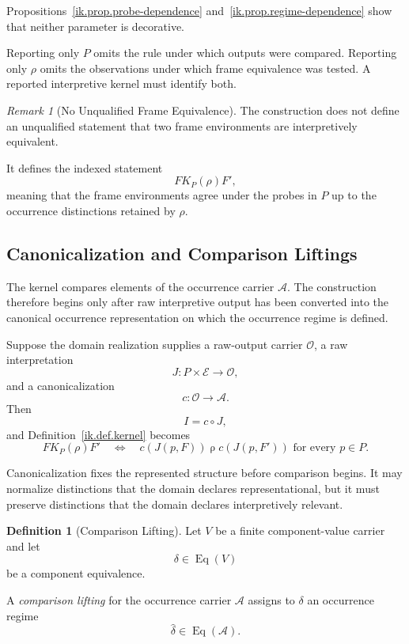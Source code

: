 \documentclass[11pt]{article}
\theoremstyle{plain}
\theoremstyle{definition}
\newtheorem{definition}[theorem]{Definition}
\theoremstyle{remark}
\newtheorem{remark}[theorem]{Remark}
\begin{document}
Propositions~\ref{ik.prop.probe-dependence}
and~\ref{ik.prop.regime-dependence}
show that neither parameter is decorative.

Reporting only \(P\)
omits the rule under which outputs were compared.
Reporting only \(\rho\)
omits the observations under which frame equivalence was tested.
A reported interpretive kernel must identify both.

\begin{remark}[No Unqualified Frame Equivalence]
  \label{ik.rem.no-unqualified-equivalence}
  The construction does not define an unqualified statement
  that two frame environments are interpretively equivalent.

  It defines the indexed statement
  \[
    F\mathrel{K_P(\rho)}F',
  \]
  meaning that the frame environments agree
  under the probes in \(P\)
  up to the occurrence distinctions retained by \(\rho\).
\end{remark}

\subsection{Canonicalization and Comparison Liftings}

The kernel compares elements of the occurrence carrier \(\mathcal{A}\).
The construction therefore begins only after raw interpretive output
has been converted into the canonical occurrence representation
on which the occurrence regime is defined.

Suppose the domain realization supplies
a raw-output carrier \(\mathcal{O}\),
a raw interpretation
\[
  J:
  P\times\mathcal{E}
  \longrightarrow
  \mathcal{O},
\]
and a canonicalization
\[
  c:
  \mathcal{O}
  \longrightarrow
  \mathcal{A}.
\]
Then
\[
  I
  =
  c\circ J,
\]
and Definition~\ref{ik.def.kernel}
becomes
\[
  F\mathrel{K_P(\rho)}F'
  \quad\Longleftrightarrow\quad
  c(J(p,F))
  \mathrel{\rho}
  c(J(p,F'))
  \text{ for every }p\in P.
\]

Canonicalization fixes the represented structure
before comparison begins.
It may normalize distinctions
that the domain declares representational,
but it must preserve distinctions
that the domain declares interpretively relevant.

\begin{definition}[Comparison Lifting]
  \label{ik.def.comparison-lifting}
  Let \(V\) be a finite component-value carrier
  and let
  \[
    \delta\in\operatorname{Eq}(V)
  \]
  be a component equivalence.

  A \emph{comparison lifting} for the occurrence carrier \(\mathcal{A}\)
  assigns to \(\delta\) an occurrence regime
  \[
    \widehat{\delta}
    \in
    \operatorname{Eq}(\mathcal{A}).
  \]
\end{definition}
\end{document}
